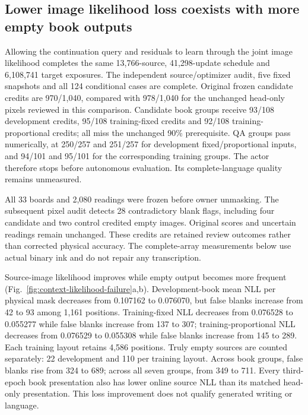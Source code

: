\subsection*{Lower image likelihood loss coexists with more empty book outputs}

Allowing the continuation query and residuals to learn through the joint image
likelihood completes the same 13,766-source, 41,298-update schedule and
6,108,741 target exposures. The independent source/optimizer audit, five fixed
snapshots and all 124 conditional cases are complete. Original frozen candidate
credits are 970/1,040, compared with 978/1,040 for the unchanged head-only pixels
reviewed in this comparison. Candidate book groups receive 93/108 development
credits, 95/108 training-fixed credits and 92/108 training-proportional credits;
all miss the unchanged 90\% prerequisite. QA groups pass numerically, at
250/257 and 251/257 for development fixed/proportional inputs, and 94/101 and
95/101 for the corresponding training groups. The actor therefore stops before
autonomous evaluation. Its complete-language quality remains unmeasured.

All 33 boards and 2,080 readings were frozen before owner unmasking. The
subsequent pixel audit detects 28 contradictory blank flags, including four
candidate and two control credited empty images. Original scores and uncertain
readings remain unchanged. These credits are retained review outcomes rather
than corrected physical accuracy. The complete-array measurements below use
actual binary ink and do not repair any transcription.

Source-image likelihood improves while empty output becomes more frequent
(Fig.~\ref{fig:context-likelihood-failure}a,b). Development-book mean NLL per
physical mask decreases from 0.107162 to 0.076070, but false blanks increase
from 42 to 93 among 1,161 positions. Training-fixed NLL decreases from 0.076528
to 0.055277 while false blanks increase from 137 to 307; training-proportional
NLL decreases from 0.076529 to 0.055308 while false blanks increase from 145
to 289. Each training layout retains 4,586 positions. Truly empty sources are
counted separately: 22 development and 110 per training layout. Across book
groups, false blanks rise from 324 to 689; across all seven groups, from 349
to 711. Every third-epoch book presentation also has lower online source NLL
than its matched head-only presentation. This loss improvement does not
qualify generated writing or language.


